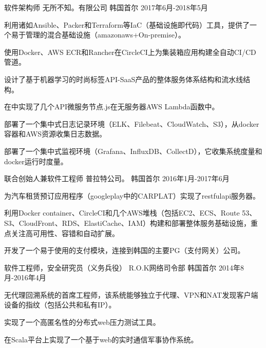 

\begin{cventries}

  \cventry
    {软件架构师} %
    {无所不知。有限公司} %
    {韩国首尔} %
    {2017年6月-2018年5月} %
    {
      \begin{cvitems} %
        \item {利用诸如Ansible、Packer和Terraform等IaC（基础设施即代码）工具，提供了一个易于管理的混合基础设施（amazonaws+On-premise）。}
        \item {使用Docker、AWS ECR和Rancher在CircleCI上为集装箱应用构建全自动CI/CD管道。}
        \item {设计了基于机器学习的时尚标签API-SaaS产品的整体服务体系结构和流水线结构。}
        \item {在中实现了几个API微服务节点.js在无服务器AWS Lambda函数中。}
        \item {部署了一个集中式日志记录环境（ELK、Filebeat、CloudWatch、S3），从docker容器和AWS资源收集日志数据。}
        \item {部署了一个集中式监视环境（Grafana、InfluxDB、CollectD），它收集系统度量和docker运行时度量。}
      \end{cvitems}
    }

  \cventry
    {联合创始人兼软件工程师} %
    {普拉特公司。} %
    {韩国首尔} %
    {2016年1月-2017年6月} %
    {
      \begin{cvitems} %
        \item {为汽车租赁预订应用程序（googleplay中的CARPLAT）实现了restfulapi服务器。}
        \item {利用Docker container、CircleCI和几个AWS堆栈（包括EC2、ECS、Route 53、S3、CloudFront、RDS、ElastiCache、IAM）构建和部署整体服务基础设施，重点关注高可用性、容错和自动扩展。}
        \item {开发了一个易于使用的支付模块，连接到韩国的主要PG（支付网关）公司。}
      \end{cvitems}
    }

  \cventry
    {软件工程师，安全研究员（义务兵役）} %
    {R.O.K网络司令部} %
    {韩国首尔} %
    {2014年8月-2016年4月} %
    {
      \begin{cvitems} %
        \item {无代理回溯系统的首席工程师，该系统能够独立于代理、VPN和NAT发现客户端设备的指纹（包括公共和私有IP）。}
        \item {实现了一个高匿名性的分布式web压力测试工具。}
        \item {在Scala平台上实现了一个基于web的实时通信军事协作系统。}
      \end{cvitems}
    }


\end{cventries}
